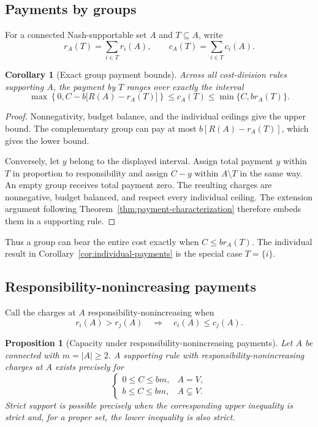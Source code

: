 \documentclass[preprint,12pt,authoryear]{elsarticle}
\newtheorem{proposition}{Proposition}
\newtheorem{corollary}{Corollary}
\begin{document}
\subsection{Payments by groups}

For a connected Nash-supportable set \(A\) and \(T\subseteq A\), write
\[
 r_A(T)=\sum_{i\in T}r_i(A),
 \qquad
 c_A(T)=\sum_{i\in T}c_i(A).
\]

\begin{corollary}[Exact group payment bounds]
\label{cor:group-payment-bounds}
Across all cost-division rules supporting \(A\), the payment by \(T\) ranges
over exactly the interval
\[
 \max\left\{0,C-b\bigl[R(A)-r_A(T)\bigr]\right\}
 \leq c_A(T)\leq
 \min\{C,br_A(T)\}.
\]
\end{corollary}

\begin{proof}
Nonnegativity, budget balance, and the individual ceilings give the upper
bound. The complementary group can pay at most \(b[R(A)-r_A(T)]\), which gives
the lower bound.

Conversely, let \(y\) belong to the displayed interval. Assign total payment
\(y\) within \(T\) in proportion to responsibility and assign \(C-y\) within
\(A\setminus T\) in the same way. An empty group receives total payment zero.
The resulting charges are nonnegative, budget balanced, and respect every
individual ceiling. The extension argument following
Theorem~\ref{thm:payment-characterization} therefore embeds them in a supporting
rule.
\end{proof}

Thus a group can bear the entire cost exactly when \(C\leq br_A(T)\). The
individual result in Corollary~\ref{cor:individual-payments} is the special
case \(T=\{i\}\).

\subsection{Responsibility-nonincreasing payments}

Call the charges at \(A\) responsibility-nonincreasing when
\[
 r_i(A)>r_j(A)
 \quad\Longrightarrow\quad
 c_i(A)\leq c_j(A).
\]

\begin{proposition}[Capacity under responsibility-nonincreasing payments]
\label{prop:responsibility-nonincreasing}
Let \(A\) be connected with \(m=|A|\geq2\). A supporting rule with
responsibility-nonincreasing charges at \(A\) exists precisely for
\[
 \begin{cases}
 0\leq C\leq bm,&A=V,\\
 b\leq C\leq bm,&A\subsetneq V.
 \end{cases}
\]
Strict support is possible precisely when the corresponding upper inequality
is strict and, for a proper set, the lower inequality is also strict.
\end{proposition}
\end{document}
